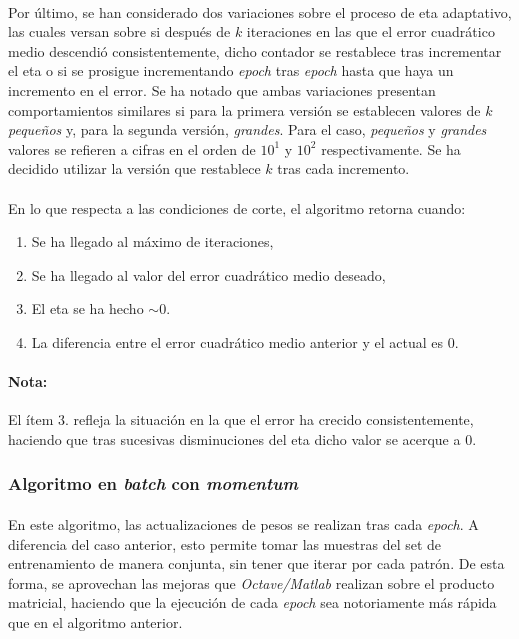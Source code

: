 \documentclass[12pt, twocolumn]{article}
\begin{document}
	\paragraph{} Por último, se han considerado dos variaciones sobre el proceso de eta adaptativo, las cuales versan sobre si después de $k$ iteraciones en las que el error cuadrático medio descendió consistentemente, dicho contador se restablece tras incrementar el eta o si se prosigue incrementando \textit{epoch} tras \textit{epoch} hasta que haya un incremento en el error. Se ha notado que ambas variaciones presentan comportamientos similares si para la primera versión se establecen valores de $k$ \textit{pequeños} y, para la segunda versión, \textit{grandes}. Para el caso, \textit{pequeños} y \textit{grandes} valores se refieren a cifras en el orden de $10^{1}$ y $10^{2}$ respectivamente. Se ha decidido utilizar la versión que restablece $k$ tras cada incremento.
	
	\paragraph{} En lo que respecta a las condiciones de corte, el algoritmo retorna cuando:
	
	\begin{enumerate}
		\item Se ha llegado al máximo de iteraciones,
		\item Se ha llegado al valor del error cuadrático medio deseado,
		\item El eta se ha hecho $\sim 0$. 
		\item La diferencia entre el error cuadrático medio anterior y el actual es $0$.
	\end{enumerate}
	
	\paragraph{Nota:} El ítem $3.$ refleja la situación en la que el error ha crecido consistentemente, haciendo que tras sucesivas disminuciones del eta dicho valor se acerque a $0$. 
	
	
	\subsubsection{Algoritmo en \textit{batch} con \textit{momentum}}
	
	\paragraph{} En este algoritmo, las actualizaciones de pesos se realizan tras cada \textit{epoch}. A diferencia del caso anterior, esto permite tomar las muestras del set de entrenamiento de manera conjunta, sin tener que iterar por cada patrón. De esta forma, se aprovechan las mejoras que \textit{Octave/Matlab} realizan sobre el producto matricial, haciendo que la ejecución de cada \textit{epoch} sea notoriamente más rápida que en el algoritmo anterior. 
	
\end{document}
